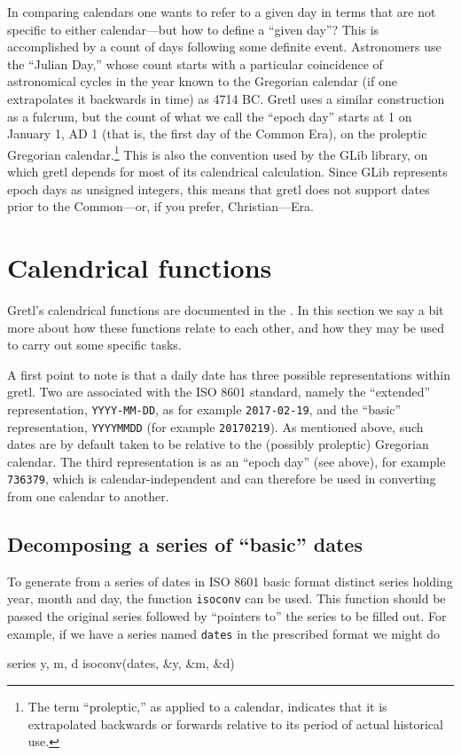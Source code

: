 In comparing calendars one wants to refer to a given day in terms that
are not specific to either calendar---but how to define a ``given
day''? This is accomplished by a count of days following some definite
event. Astronomers use the ``Julian Day,'' whose count starts with a
particular coincidence of astronomical cycles in the year known to the
Gregorian calendar (if one extrapolates it backwards in time) as 4714
BC. Gretl uses a similar construction as a fulcrum, but the count of
what we call the ``epoch day'' starts at 1 on January 1, AD 1 (that
is, the first day of the Common Era), on the proleptic Gregorian
calendar.\footnote{The term ``proleptic,'' as applied to a calendar,
  indicates that it is extrapolated backwards or forwards relative to
  its period of actual historical use.} This is also the convention
used by the \textsf{GLib} library, on which gretl depends for most of
its calendrical calculation. Since \textsf{GLib} represents epoch days
as unsigned integers, this means that gretl does not support dates
prior to the Common---or, if you prefer, Christian---Era.

\section{Calendrical functions}
\label{sec:cal-functions}

Gretl's calendrical functions are documented in the \GCR{}. In this
section we say a bit more about how these functions relate to each
other, and how they may be used to carry out some specific tasks.

A first point to note is that a daily date has three possible
representations within gretl. Two are associated with the ISO 8601
standard, namely the ``extended'' representation, \texttt{YYYY-MM-DD},
as for example \texttt{2017-02-19}, and the ``basic'' representation,
\texttt{YYYYMMDD} (for example \texttt{20170219}). As mentioned above,
such dates are by default taken to be relative to the (possibly
proleptic) Gregorian calendar. The third representation is as an
``epoch day'' (see above), for example \texttt{736379}, which is
calendar-independent and can therefore be used in converting from one
calendar to another.

\subsection{Decomposing a series of ``basic'' dates}

To generate from a series of dates in ISO 8601 basic format distinct
series holding year, month and day, the function \texttt{isoconv} can
be used. This function should be passed the original series followed
by ``pointers to'' the series to be filled out. For example, if we
have a series named \texttt{dates} in the prescribed format we might
do
%
\begin{code}
series y, m, d
isoconv(dates, &y, &m, &d)
\end{code}

